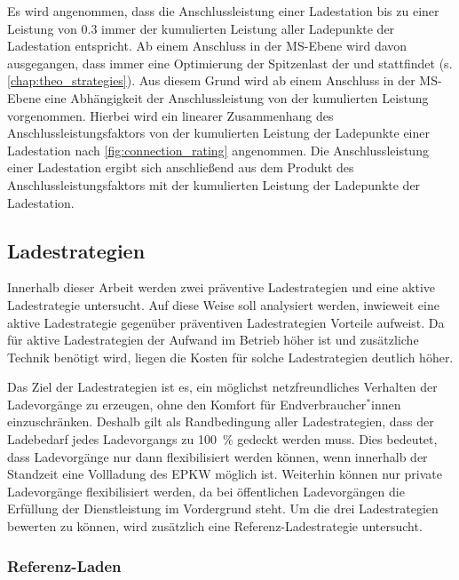 Es wird angenommen, dass die Anschlussleistung einer Ladestation bis zu einer Leistung von \SI{0.3}{\mva} immer der kumulierten Leistung aller Ladepunkte der Ladestation entspricht.
Ab einem Anschluss in der \gls{MS}-Ebene wird davon ausgegangen, dass immer eine Optimierung der Spitzenlast der \UCs \zH und \Firmeparkplatz stattfindet (s. \autoref{chap:theo_strategies}).
Aus diesem Grund wird ab einem Anschluss in der \gls{MS}-Ebene eine Abhängigkeit der Anschlussleistung von der kumulierten Leistung vorgenommen.
Hierbei wird ein linearer Zusammenhang des Anschlussleistungsfaktors von der kumulierten Leistung der Ladepunkte einer Ladestation nach \autoref{fig:connection_rating} angenommen.
Die Anschlussleistung einer Ladestation ergibt sich anschließend aus dem Produkt des Anschlussleistungsfaktors mit der kumulierten Leistung der Ladepunkte der Ladestation.




\subsection{Ladestrategien}\label{chap:theo_strategies}

Innerhalb dieser Arbeit werden zwei präventive Ladestrategien und eine aktive Ladestrategie untersucht.
Auf diese Weise soll analysiert werden, inwieweit eine aktive Ladestrategie gegenüber präventiven Ladestrategien Vorteile aufweist.
Da für aktive Ladestrategien der Aufwand im Betrieb höher ist und zusätzliche Technik benötigt wird, liegen die Kosten für solche Ladestrategien deutlich höher.\medskip

Das Ziel der Ladestrategien ist es, ein möglichst netzfreundliches Verhalten der Ladevorgänge zu erzeugen, ohne den Komfort für Endverbraucher$^*$innen einzuschränken.
Deshalb gilt als Randbedingung aller Ladestrategien, dass der Ladebedarf jedes Ladevorgangs zu \SI{100}{\percent} gedeckt werden muss.
Dies bedeutet, dass Ladevorgänge nur dann flexibilisiert werden können, wenn innerhalb der Standzeit eine Vollladung des \gls{EPKW} möglich ist.
Weiterhin können nur private Ladevorgänge flexibilisiert werden, da bei öffentlichen Ladevorgängen die Erfüllung der Dienstleistung im Vordergrund steht.
Um die drei Ladestrategien bewerten zu können, wird zusätzlich eine Referenz-Ladestrategie untersucht.


\subsubsection{Referenz-Laden}

